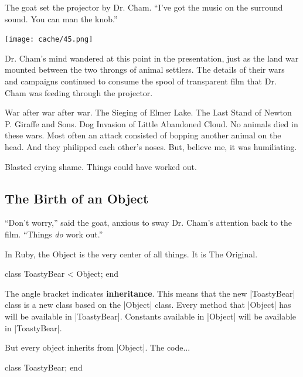 \documentclass[12pt,twoside]{report}
\begin{document}
The goat set the projector by Dr. Cham.  ``I've got the music on the
surround sound. You can man the knob.''

	\texttt{[image: cache/45.png]}

Dr. Cham's mind wandered at this point in the presentation, just as
the land war mounted between the two throngs of animal settlers.  The
details of their wars and campaigns continued to consume the spool of
transparent film that Dr. Cham was feeding through the projector.

War after war after war.  The Sieging of Elmer Lake.  The Last Stand
of Newton P. Giraffe and Sons.  Dog Invasion of Little Abandoned
Cloud.  No animals died in these wars.  Most often an attack consisted
of bopping another animal on the head.  And they philipped each
other's noses.  But, believe me, it was humiliating.

Blasted crying shame.  Things could have worked out.



\subsection{The Birth of an Object}



``Don't worry,'' said the goat, anxious to sway Dr. Cham's attention
back to the film.  ``Things {\em do} work out.''

In Ruby, the Object is the very center of all things.  It is The
Original.


\begin{rubycode}

 class ToastyBear < Object; end

\end{rubycode}


The angle bracket indicates {\bf inheritance}.  This means that the
new \rubyinline|ToastyBear| class is a new class based
on the \rubyinline|Object| class.  Every method that
\rubyinline|Object| has will be available in
\rubyinline|ToastyBear|.  Constants available in
\rubyinline|Object| will be available in
\rubyinline|ToastyBear|.

But every object inherits from \rubyinline|Object|.
The code...


\begin{rubycode}

 class ToastyBear; end

\end{rubycode}
\end{document}
